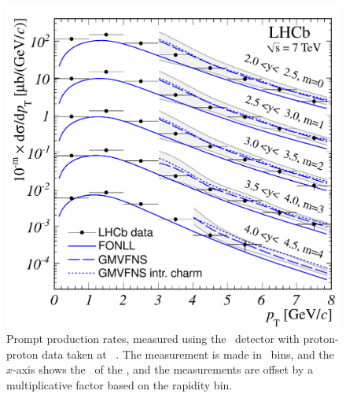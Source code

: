 \begin{figure}
  \centering
  \includegraphics[width=\textwidth]{figures/production/lhcb_dz_xsec_7tev}
  \caption{%
    Prompt \PDzero production rates, measured using the \lhcb\ detector with 
    proton-proton data taken at ~\cite{LHCb-PAPER-2012-041}.
    The measurement is made in \pTy\ bins, and the $x$-axis shows the \pT\ of 
    the \PDzero, and the measurements are offset by a multiplicative factor 
    based on the rapidity bin.
  }
  \label{fig:prod:theory:comparisons:7tev}
\end{figure}
